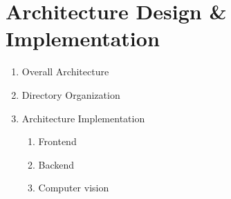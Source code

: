 \newcommand{\addImage}[2]{
  \begin{figure}[!htb]
    \begin{center}
      \texttt{[image: \#1]}
      \caption{#2} %
      \renewcommand{\thefigure}{\thesubsection.\arabic{figure}}
    \end{center}
  \end{figure}
}

\newpage
\section{\Large{Architecture Design \& Implementation}}

\begin{enumerate}[label=\arabic*]
  \item {\large{Overall Architecture}}\\

  \item {\large{Directory Organization}}\\
        

        \newpage
  \item {\large{Architecture Implementation}}\\
        \begin{enumerate}[label=\alph*]
          \item Frontend\\
                

                \newpage
          \item Backend\\
                

                \newpage
          \item Computer vision\\
                

        \end{enumerate}
\end{enumerate}